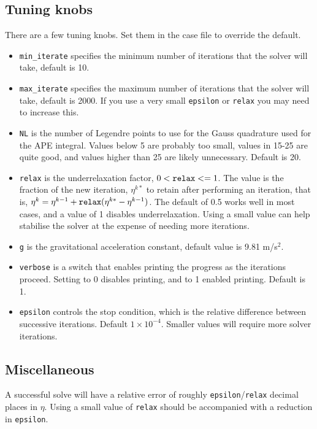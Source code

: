\documentclass[letterpaper]{article}
\begin{document}
\subsection{Tuning knobs}
There are a few tuning knobs. Set them in the case file to override the default.
\begin{itemize}
 \item \verb+min_iterate+ specifies the minimum number of iterations that the solver will take, default is 10.
 \item \verb+max_iterate+ specifies the maximum number of iterations that the solver will take, default is 2000. If you use a very small \verb+epsilon+ or \verb+relax+ you may need to increase this. 
 \item \verb+NL+ is the number of Legendre points to use for the Gauss quadrature used for the APE integral. Values below 5 are probably too small, values in 15-25 are quite good, and values higher than 25 are likely unnecessary. Default is 20.
 \item \verb+relax+ is the underrelaxation factor, $0 < \verb+relax+ <= 1$.
        The value is the fraction of the new iteration, $\eta^{k*}$ to retain
        after performing an iteration, that is,
        $\eta^k = \eta^{k-1} + \verb+relax+(\eta^{k*} - \eta^{k-1})$.
        The default of 0.5 works well in most cases, and a value of 1 disables underrelaxation.
        Using a small value can help stabilise the solver at the expense of needing more iterations.
 \item \verb+g+ is the gravitational acceleration constant, default value is 9.81 m/s$^2$.
 \item \verb+verbose+ is a switch that enables printing the progress as the iterations proceed. Setting to 0 disables printing, and to 1 enabled printing. Default is 1.
\item \verb+epsilon+ controls the stop condition, which is the relative difference between successive iterations. Default $1\times10^{-4}$. Smaller values will require more solver iterations.
\end{itemize}

\subsection{Miscellaneous}

A successful solve will have a relative error of roughly \verb+epsilon+/\verb+relax+ decimal places in $\eta$. Using a small value of \verb+relax+ should be accompanied with a reduction in \verb+epsilon+.
\end{document}
